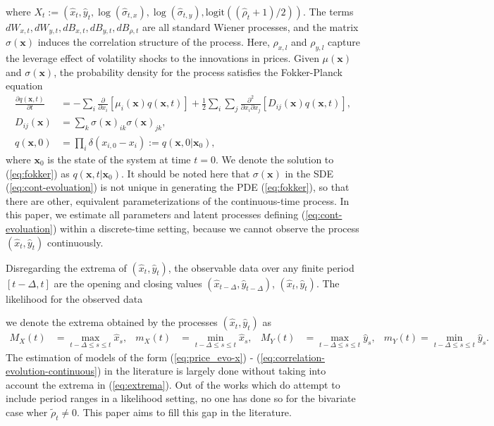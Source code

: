 \documentclass[10pt]{article}
\begin{document}
where
$X_t := (\hat{x}_t, \hat{y}_t, \log(\hat{\sigma}_{t,x}),
\log(\hat{\sigma}_{t,y}), \mbox{logit}((\hat{\rho}_{t} + 1)/2))$. The
terms $ dW_{x,t} , dW_{y,t} , dB_{x,t} , dB_{y,t} , dB_{\rho,t}$ are
all standard Wiener processes, and the matrix $\sigma(\mathbf{x})$
induces the correlation structure of the process. Here, $\rho_{x,l}$
and $\rho_{y,l}$ capture the leverage effect of volatility shocks to
the innovations in prices. Given $\mu(\mathbf{x})$ and
$\sigma(\mathbf{x})$, the probability density for the process
satisfies the Fokker-Planck equation
\begin{align}
  \frac{\partial q(\mathbf{x},t)}{\partial t} &= -\sum_{i} \frac{\partial}{\partial x_i} \left[\mu_i(\mathbf{x}) q(\mathbf{x},t) \right] + \frac{1}{2} \sum_i \sum_j \frac{\partial^2}{\partial x_i \partial x_j} \left[ D_{ij}(\mathbf{x}) q(\mathbf{x},t) \right], \label{eq:fokker} \\
  D_{ij}(\mathbf{x}) &= \sum_k \sigma(\mathbf{x})_{ik}\sigma(\mathbf{x})_{jk}, \nonumber \\
  q(\mathbf{x},0) &= \prod_i \delta(x_{i,0} - x_i) := q(\mathbf{x}, 0 | \mathbf{x}_0), \nonumber
\end{align}
where $\mathbf{x}_0$ is the state of the system at time $t=0$. We
denote the solution to (\ref{eq:fokker}) as
$q(\mathbf{x}, t | \mathbf{x}_0)$. It should be noted here that
$\sigma(\mathbf{x})$ in the SDE (\ref{eq:cont-evoluation}) is not
unique in generating the PDE (\ref{eq:fokker}), so that there are
other, equivalent parameterizations of the continuous-time process. In
this paper, we estimate all parameters and latent processes defining
(\ref{eq:cont-evoluation}) within a discrete-time setting, because we
cannot observe the process $(\hat{x}_t, \hat{y}_t)$ continuously.

Disregarding the extrema of $(\hat{x}_t, \hat{y}_t)$, the observable
data over any finite period $[t-\Delta, t]$ are the opening and
closing values $(\hat{x}_{t-\Delta}, \hat{y}_{t-\Delta})$,
$(\hat{x}_{t}, \hat{y}_{t})$. The likelihood for the observed data 


we denote the extrema obtained by the
processes $(\hat{x}_t, \hat{y}_t)$ as
\begin{align}
M_X(t) &=\max_{t-\Delta\leq s\leq t}\hat{x}_s, & m_X(t) &=\min_{t-\Delta\leq s\leq t}\hat{x}_s, &
M_Y(t) &=\max_{t-\Delta\leq s\leq t}\hat{y}_s, & m_Y(t)=\min_{t-\Delta \leq s\leq t}\hat{y}_s. \label{eq:extrema}
\end{align}
The estimation of models of the form (\ref{eq:price_evo-x}) -
(\ref{eq:correlation-evolution-continuous}) in the literature is
largely done without taking into account the extrema in
(\ref{eq:extrema}). Out of the works which do attempt to include
period ranges in a likelihood setting, no one has done so for the
bivariate case wher $\tilde{\rho}_t \neq 0$. This paper aims to fill
this gap in the literature.
\end{document}

